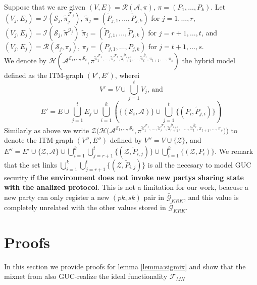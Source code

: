 \documentclass{acm_proc_article-sp}
\begin{document}
\begin{defAppendix}
Suppose that we are given $(V, E) = \mathcal{R}(\mathcal{A}, \pi)$, $\pi = (P_1, \ldots, P_k)$.
Let $(V_j, E_j) =
\mathcal{I}(\mathcal{S}_j,
            \tilde{\pi}^{\mathcal{F}_j}_j)$,
$\tilde{\pi}_j = (\tilde{P}_{j, 1}, \ldots, \tilde{P}_{j, k})$ for $j = 1, \ldots, r$,
$(V_j, E_j) = \mathcal{I}(\mathcal{S}_j,
                          \tilde{\pi}^{\bar{\mathcal{G}}_j})$
$\tilde{\pi}_j = (\tilde{P}_{j, 1}, \ldots, \tilde{P}_{j, k})$ for $j = r+1, \ldots, t$,
and $(V_j, E_j) =
\mathcal{R}(\mathcal{S}_j,\pi_j)$,
$\pi_j = (P_{j, 1}, \ldots, P_{j, k})$ for $j = t+1, \ldots, s$.\\
We denote by $\mathcal{H}(\mathcal{A}^{\mathcal{S}_1, \ldots, \mathcal{S}_t},
\pi^{\tilde{\pi}_1^{\mathcal{F}_1}, \ldots, \tilde{\pi}_r^{\mathcal{F}_r},
\tilde{\pi}_{r+1}^{\bar{\mathcal{G}}_{r+1}}, \ldots, \tilde{\pi}_t^{\bar{\mathcal{G}}_t},
\pi_{t+1}, \ldots, \pi_s})$ the hybrid model defined as the ITM-graph $(V', E')$, wherei
$$V' = V \cup \bigcup_{j=1}^t V_j \textrm{, and}$$
$$E' = E \cup \bigcup_{j=1}^t E_j \cup \bigcup_{i=1}^k \left(\{(\mathcal{S}_i, \mathcal{A})\}
\cup \bigcup_{j=1}^t \{(P_i, \tilde{P}_{j, i})\}\right)$$
Similarly as above we write $\mathcal{Z}(\mathcal{H}(\mathcal{A}^{\mathcal{S}_1, \ldots,
\mathcal{S}_t}, \pi^{\tilde{\pi}_1^{\mathcal{F}_1}, \ldots, \tilde{\pi}_r^{\mathcal{F}_r},
\tilde{\pi}_{r+1}^{\bar{\mathcal{G}}_{r+1}},}$ ${}^{\ldots, \tilde{\pi}_t^{\bar{\mathcal{G}}_t},
\pi_{t+1}, \ldots, \pi_s}))$ to denote the ITM-graph $(V'', E'')$ defined by $V'' = V \cup
\{\mathcal{Z}\}$, and $E'' = E' \cup \{\mathcal{Z}, \mathcal{A}\} \cup \bigcup_{i=1}^k
\bigcup_{j=r+1}^t \{(\mathcal{Z}, \tilde{P}_{i,j})\} \cup \bigcup_{i=1}^k \{(\mathcal{Z}, P_i)\}$.
We remark that the set links $\bigcup_{i=1}^k \bigcup_{j=r+1}^t \{(\mathcal{Z}, \tilde{P}_{i,j})\}$
is all the necesary to model GUC security if \textbf{the environment does not invoke new partys
sharing state with the analized protocol}. This is not a limitation for our work, beacuse a new
party can only register a new $(pk, sk)$ pair in $\bar{\mathcal{G}}_{KRK}$, and this value is completely
unrelated with the other values stored in $\bar{\mathcal{G}}_{KRK}$.
\end{defAppendix}

\section{Proofs}
In this section we provide proofs for lemma \ref{lemma:sigmix} and show that the mixnet
from \cite{Wikstrom04a} also GUC-realize the ideal functionality $\mathcal{F}_{MN}$
\end{document}
